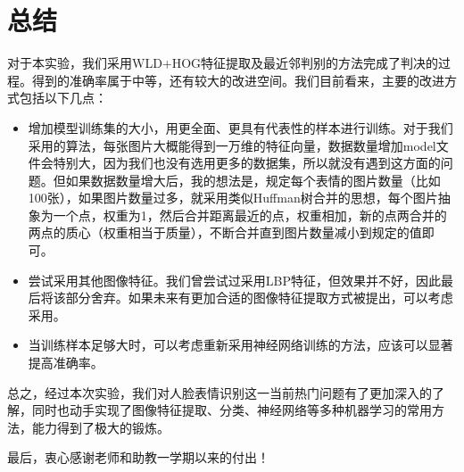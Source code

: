 \documentclass[UTF8]{ctexart}
\begin{document}
\section{总结}

对于本实验，我们采用WLD+HOG特征提取及最近邻判别的方法完成了判决的过程。得到的准确率属于中等，还有较大的改进空间。我们目前看来，主要的改进方式包括以下几点：
\begin{itemize}
  \item 增加模型训练集的大小，用更全面、更具有代表性的样本进行训练。对于我们采用的算法，每张图片大概能得到一万维的特征向量，数据数量增加model文件会特别大，因为我们也没有选用更多的数据集，所以就没有遇到这方面的问题。但如果数据数量增大后，我的想法是，规定每个表情的图片数量（比如100张），如果图片数量过多，就采用类似Huffman树合并的思想，每个图片抽象为一个点，权重为1，然后合并距离最近的点，权重相加，新的点两合并的两点的质心（权重相当于质量），不断合并直到图片数量减小到规定的值即可。
  \item 尝试采用其他图像特征。我们曾尝试过采用LBP特征，但效果并不好，因此最后将该部分舍弃。如果未来有更加合适的图像特征提取方式被提出，可以考虑采用。
  \item 当训练样本足够大时，可以考虑重新采用神经网络训练的方法，应该可以显著提高准确率。
\end{itemize}

总之，经过本次实验，我们对人脸表情识别这一当前热门问题有了更加深入的了解，同时也动手实现了图像特征提取、分类、神经网络等多种机器学习的常用方法，能力得到了极大的锻炼。

最后，衷心感谢老师和助教一学期以来的付出！



\end{document}
